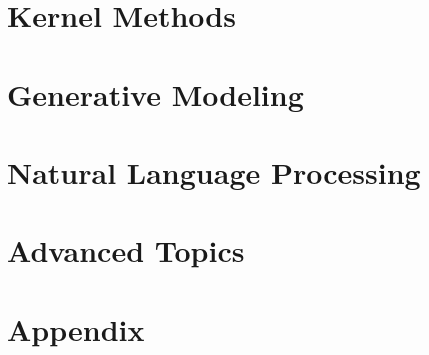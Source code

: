 \documentclass[oneside, a4paper,11pt]{book}
\begin{document}
\part{Kernel Methods}



% 
\part{Generative Modeling}






% 



\part{Natural Language Processing}

\part{Advanced Topics}


\part{Appendix}


\backmatter

\nocite{*}


\end{document}
